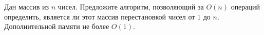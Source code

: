 \documentclass{article}
\begin{document}
Дан массив из $n$ чисел. Предложите алгоритм, позволяющий за $O(n)$ операций определить, является ли этот массив перестановкой чисел от 
$1$ до $n$. Дополнительной памяти не более $O(1)$.
\end{document}
